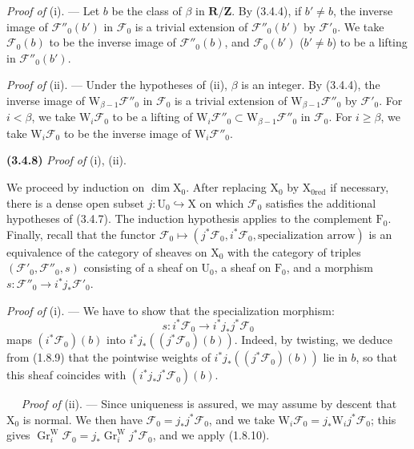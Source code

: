 \documentclass[11pt,leqno]{article}
\newcommand{\Page}[1]{\ifvmode\noindent\else\unskip\ \fi{\footnotesize\textcolor{gray}{[p.\,#1]}}\ \ignorespaces}
\begin{document}
\textit{Proof of} (i). — Let \(b\) be the class of \(\beta\) in \(\mathbf R/\mathbf Z\). By (3.4.4), if \(b'\ne b\), the inverse image of \(\mathscr F''_0(b')\) in \(\mathscr F_0\) is a trivial extension of \(\mathscr F''_0(b')\) by \(\mathscr F'_0\). We take \(\mathscr F_0(b)\) to be the inverse image of \(\mathscr F''_0(b)\), and \(\mathscr F_0(b')\) (\(b'\ne b\)) to be a lifting in \(\mathscr F''_0(b')\).

\textit{Proof of} (ii). — Under the hypotheses of (ii), \(\beta\) is an integer. By (3.4.4), the inverse image of \(\mathrm W_{\beta-1}\mathscr F''_0\) in \(\mathscr F_0\) is a trivial extension of \(\mathrm W_{\beta-1}\mathscr F''_0\) by \(\mathscr F'_0\). For \(i<\beta\), we take \(\mathrm W_i\mathscr F_0\) to be a lifting of \(\mathrm W_i\mathscr F''_0\subset\mathrm W_{\beta-1}\mathscr F''_0\) in \(\mathscr F_0\). For \(i\geq\beta\), we take \(\mathrm W_i\mathscr F_0\) to be the inverse image of \(\mathrm W_i\mathscr F''_0\).

\textbf{(3.4.8)} \textit{Proof of} (i), (ii).

We proceed by induction on \(\dim\mathrm X_0\). After replacing \(\mathrm X_0\) by \(\mathrm X_{0\mathrm{red}}\) if necessary, there is a dense open subset \(j:\mathrm U_0\hookrightarrow\mathrm X\) on which \(\mathscr F_0\) satisfies the additional hypotheses of (3.4.7). The induction hypothesis applies to the complement \(\mathrm F_0\). Finally, recall that the functor \(\mathscr F_0\mapsto(j^*\mathscr F_0,i^*\mathscr F_0,\text{specialization arrow})\) is an equivalence of the category of sheaves on \(\mathrm X_0\) with the category of triples \((\mathscr F'_0,\mathscr F''_0,s)\) consisting of a sheaf on \(\mathrm U_0\), a sheaf on \(\mathrm F_0\), and a morphism \(s:\mathscr F''_0\to i^*j_*\mathscr F'_0\).

\textit{Proof of} (i). — We have to show that the specialization morphism:
\[
s:i^*\mathscr F_0\to i^*j_*j^*\mathscr F_0
\]
maps \((i^*\mathscr F_0)(b)\) into \(i^*j_*((j^*\mathscr F_0)(b))\). Indeed, by twisting, we deduce from (1.8.9) that the pointwise weights of \(i^*j_*((j^*\mathscr F_0)(b))\) lie in \(b\), so that this sheaf coincides with \((i^*j_*j^*\mathscr F_0)(b)\).

\Page{210}
\textit{Proof of} (ii). — Since uniqueness is assured, we may assume by descent that \(\mathrm X_0\) is normal. We then have \(\mathscr F_0=j_*j^*\mathscr F_0\), and we take \(\mathrm W_i\mathscr F_0=j_*\mathrm W_i j^*\mathscr F_0\); this gives \(\operatorname{Gr}_i^{\mathrm W}\mathscr F_0=j_*\operatorname{Gr}_i^{\mathrm W}j^*\mathscr F_0\), and we apply (1.8.10).
\end{document}
